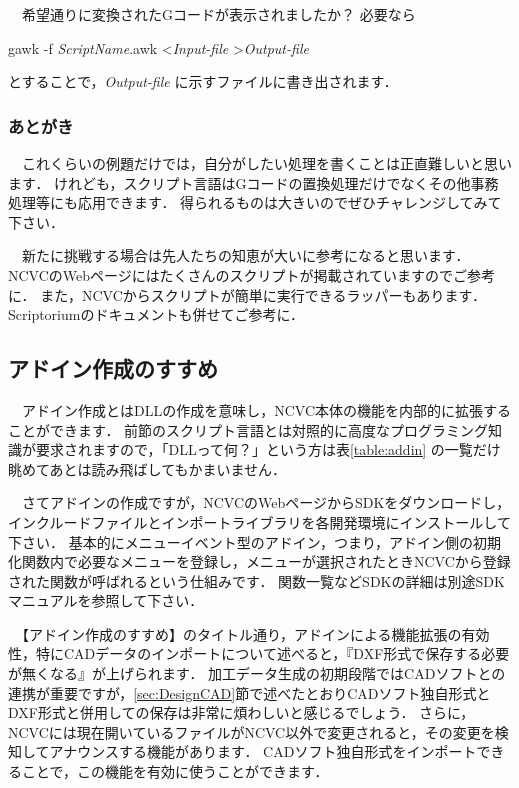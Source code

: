\vspace*{1zh}
　希望通りに変換されたGコードが表示されましたか？
必要なら

\vspace*{1zh}
\begin{shadebox}
gawk -f \textit{ScriptName}.awk \textless \textit{Input-file} \textgreater \textit{Output-file}
\end{shadebox}

\vspace*{1zh}
とすることで，\textit{Output-file} に示すファイルに書き出されます．

\subsubsection{あとがき}
　これくらいの例題だけでは，自分がしたい処理を書くことは正直難しいと思います．
けれども，スクリプト言語はGコードの置換処理だけでなくその他事務処理等にも応用できます．
得られるものは大きいのでぜひチャレンジしてみて下さい．

　新たに挑戦する場合は先人たちの知恵が大いに参考になると思います．
NCVCのWebページにはたくさんのスクリプトが掲載されていますのでご参考に．
また，NCVCからスクリプトが簡単に実行できるラッパーもあります．Scriptoriumのドキュメントも併せてご参考に．

\subsection{アドイン作成のすすめ}
\label{sec:addin}
　アドイン作成とはDLLの作成を意味し，NCVC本体の機能を内部的に拡張することができます．
前節のスクリプト言語とは対照的に高度なプログラミング知識が要求されますので，「DLLって何？」という方は表\ref{table:addin} の一覧だけ眺めてあとは読み飛ばしてもかまいません．

　さてアドインの作成ですが，NCVCのWebページからSDKをダウンロードし，インクルードファイルとインポートライブラリを各開発環境にインストールして下さい．
基本的にメニューイベント型のアドイン，つまり，アドイン側の初期化関数内で必要なメニューを登録し，メニューが選択されたときNCVCから登録された関数が呼ばれるという仕組みです．
関数一覧などSDKの詳細は別途SDKマニュアルを参照して下さい．

　【アドイン作成のすすめ】のタイトル通り，アドインによる機能拡張の有効性，特にCADデータのインポートについて述べると，『DXF形式で保存する必要が無くなる』が上げられます．
加工データ生成の初期段階ではCADソフトとの連携が重要ですが，\ref{sec:DesignCAD}節で述べたとおりCADソフト独自形式とDXF形式と併用しての保存は非常に煩わしいと感じるでしょう．
さらに，NCVCには現在開いているファイルがNCVC以外で変更されると，その変更を検知してアナウンスする機能があります．
CADソフト独自形式をインポートできることで，この機能を有効に使うことができます．

